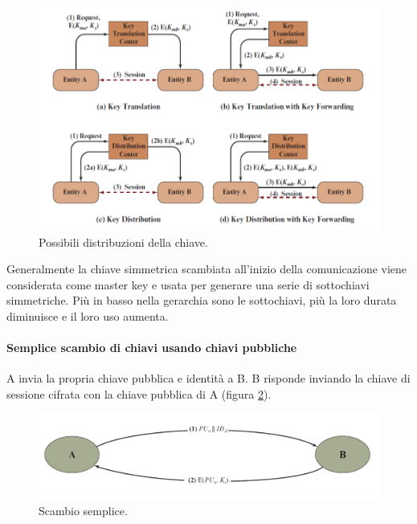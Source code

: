 \begin{figure}
    \centering
    \includegraphics[width=1\textwidth]{images/chapter3/3-1.png}
    \caption{Possibili distribuzioni della chiave.}
    \label{fig:3-1}
\end{figure}

Generalmente la chiave simmetrica scambiata all'inizio della comunicazione viene considerata come master key e usata per generare una serie di sottochiavi simmetriche. Più in basso nella gerarchia sono le sottochiavi, più la loro durata diminuisce e il loro uso aumenta.

\paragraph{Semplice scambio di chiavi usando chiavi pubbliche} A invia la propria chiave pubblica e identità a B. B risponde inviando la chiave di sessione cifrata con la chiave pubblica di A (figura \ref{fig:3-2}). 

\begin{figure}
    \centering
    \includegraphics[width=1\textwidth]{images/chapter3/3-2.png}
    \caption{Scambio semplice.}
    \label{fig:3-2}
\end{figure}

